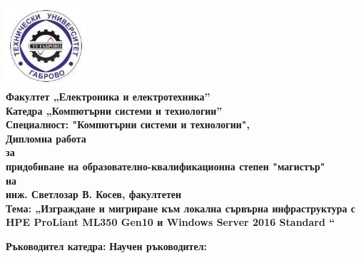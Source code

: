 \documentclass[11pt,a4paper,twoside]{article}
\begin{document}
	\pagestyle{body}
	
	\title{}
	\date{\vspace{-18ex}}
	\maketitle
	
	\thispagestyle{titlepage}
	\begin{center}
		{\includegraphics[width=3cm]{images/logo.jpg}\\    
			\huge{\textbf{Факултет „Електроника и електротехника”}}\\
			\huge{\textbf{Катедра „Компютърни системи и технологии”}}\\
			\vspace*{0.5cm}
			\Large{\textbf{Специалност: "Компютърни системи и технологии",}}\\
			\vspace*{1.5cm}
			\Huge{\textbf{Дипломна работа}}\\
			\Large{\textbf{за}}\\
			\Large{\textbf{придобиване на образователно-квалификационна степен "магистър"}}\\
			\Large{\textbf{на}}\\
			\Large{\textbf{инж. Светлозар В. Косев, факултетен }}\\
			\vspace*{0.7cm}
			\huge{\textbf{Тема: „Изграждане и мигриране към локална сървърна инфраструктура с HPE ProLiant ML350 Gen10 и Windows Server 2016 Standard “}}\\
			\vspace*{1cm}
			\begin{flushleft}                
				\large{\textbf{Ръководител катедра:}}\hspace{3cm} \large{\textbf{Научен ръководител:}}
			\end{flushleft}    
}
\end{center}
\end{document}
